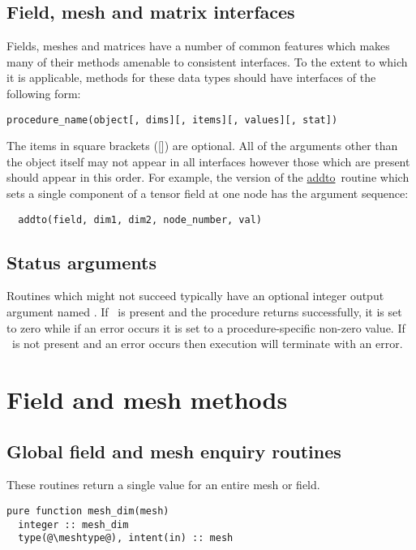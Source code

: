 \documentclass[a4paper, 11pt]{book}
\newcommand{\targetlabel}[1]{\hypertarget{#1}{}\label{#1}}
\begin{document}
\section{Field, mesh and matrix interfaces}

Fields, meshes and matrices have a number of common features which makes
many of their methods amenable to consistent interfaces. To the extent to
which it is applicable, methods for these data types should have interfaces
of the following form:
\begin{lstlisting}[language=bnf]
  procedure_name(object[, dims][, items][, values][, stat])
\end{lstlisting}
The items in square brackets ([]) are optional. All of the arguments other
than the object itself may not appear in all interfaces however those which
are present should appear in this order. For example, the version of the
\hyperlink{proc:fieldaddto}{addto}\ routine which sets a single component of
a tensor field at one node has the argument sequence:
\begin{lstlisting}
  addto(field, dim1, dim2, node_number, val)
\end{lstlisting}

\section{Status arguments}

Routines which might not succeed typically have an optional integer output
argument named \stat. If \stat\ is present and the procedure returns
successfully, it is set to zero while if an error occurs it is set to a
procedure-specific non-zero value. If \stat\ is not present and an error
occurs then execution will terminate with an error.


\chapter{Field and mesh methods}\targetlabel{chap:fieldmeshmethods}


\section{Global field and mesh enquiry routines}

These routines return a single value for an entire mesh or field.


\begin{lstlisting}
pure function mesh_dim(mesh)
  integer :: mesh_dim
  type(@\meshtype@), intent(in) :: mesh
\end{lstlisting}
\end{document}

